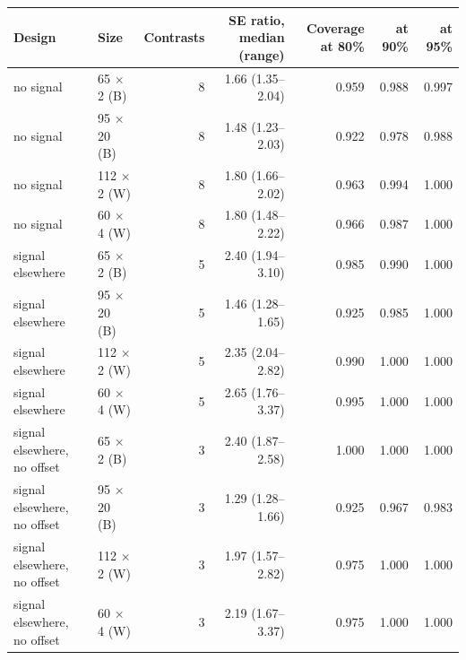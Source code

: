 \begin{tabular}{llrrrrr}
\toprule
Design & Size & Contrasts & SE ratio, median (range) & Coverage at 80\% & at 90\% & at 95\% \\
\midrule
no signal & 65 $\times$ 2 (B) & 8 & 1.66 (1.35--2.04) & 0.959 & 0.988 & 0.997 \\
no signal & 95 $\times$ 20 (B) & 8 & 1.48 (1.23--2.03) & 0.922 & 0.978 & 0.988 \\
no signal & 112 $\times$ 2 (W) & 8 & 1.80 (1.66--2.02) & 0.963 & 0.994 & 1.000 \\
no signal & 60 $\times$ 4 (W) & 8 & 1.80 (1.48--2.22) & 0.966 & 0.987 & 1.000 \\
signal elsewhere & 65 $\times$ 2 (B) & 5 & 2.40 (1.94--3.10) & 0.985 & 0.990 & 1.000 \\
signal elsewhere & 95 $\times$ 20 (B) & 5 & 1.46 (1.28--1.65) & 0.925 & 0.985 & 1.000 \\
signal elsewhere & 112 $\times$ 2 (W) & 5 & 2.35 (2.04--2.82) & 0.990 & 1.000 & 1.000 \\
signal elsewhere & 60 $\times$ 4 (W) & 5 & 2.65 (1.76--3.37) & 0.995 & 1.000 & 1.000 \\
signal elsewhere, no offset & 65 $\times$ 2 (B) & 3 & 2.40 (1.87--2.58) & 1.000 & 1.000 & 1.000 \\
signal elsewhere, no offset & 95 $\times$ 20 (B) & 3 & 1.29 (1.28--1.66) & 0.925 & 0.967 & 0.983 \\
signal elsewhere, no offset & 112 $\times$ 2 (W) & 3 & 1.97 (1.57--2.82) & 0.975 & 1.000 & 1.000 \\
signal elsewhere, no offset & 60 $\times$ 4 (W) & 3 & 2.19 (1.67--3.37) & 0.975 & 1.000 & 1.000 \\
\bottomrule
\end{tabular}
